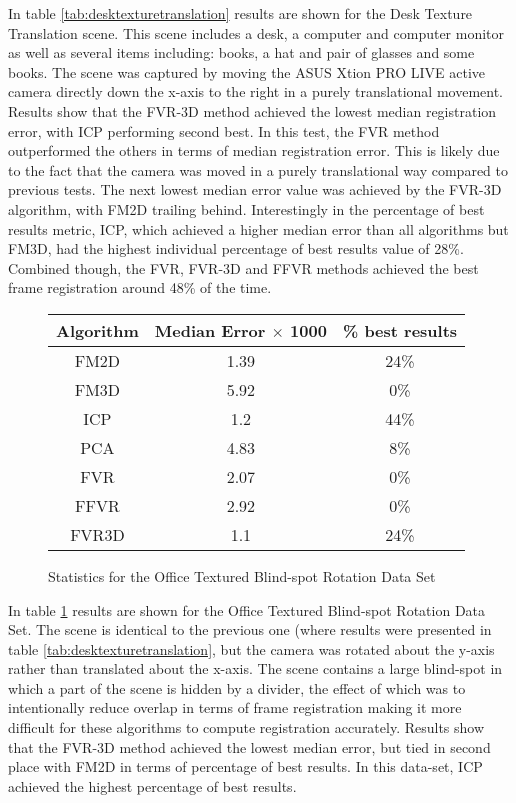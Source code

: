 In table \ref{tab:desktexturetranslation} results are shown for the Desk Texture Translation scene. This scene includes a desk, a computer and computer monitor as well as several items including: books, a hat and pair of glasses and some books. The scene was captured by moving the ASUS Xtion PRO LIVE active camera directly down the x-axis to the right in a purely translational movement. Results show that the FVR-3D method achieved the lowest median registration error, with ICP performing second best. In this test, the FVR method outperformed the others in terms of median registration error. This is likely due to the fact that the camera was moved in a purely translational way compared to previous tests. The next lowest median error value was achieved by the FVR-3D algorithm, with FM2D trailing behind. Interestingly in the percentage of best results metric, ICP, which achieved a higher median error than all algorithms but FM3D, had the highest individual percentage of best results value of 28\%. Combined though, the FVR, FVR-3D and FFVR methods achieved the best frame registration around 48\% of the time.

\begin{figure}
\centering
\begin{tabular}{ccc}
\hline
\textbf{Algorithm} & \textbf{Median Error $\times$ 1000} & \textbf{\% best results}\\ \hline
FM2D	& 1.39 & 24\%\\
FM3D	& 5.92 & 0\%\\
ICP	& 1.2 & 44\%\\
PCA	& 4.83 & 8\%\\
FVR	& 2.07 & 0\%\\
FFVR	& 2.92 & 0\%\\
FVR3D	& 1.1 & 24\%\\
\end{tabular}
\caption{Statistics for the Office Textured Blind-spot Rotation Data Set}
\label{tab:officetexturedblindspotrotation}
\end{figure} 

In table \ref{tab:officetexturedblindspotrotation} results are shown for the Office Textured Blind-spot Rotation Data Set. The scene is identical to the previous one (where results were presented in table \ref{tab:desktexturetranslation}, but the camera was rotated about the y-axis rather than translated about the x-axis. The scene contains a large blind-spot in which a part of the scene is hidden by a divider, the effect of which was to intentionally reduce overlap in terms of frame registration making it more difficult for these algorithms to compute registration accurately. Results show that the FVR-3D method achieved the lowest median error, but tied in second place with FM2D in terms of percentage of best results. In this data-set, ICP achieved the highest percentage of best results. \\

